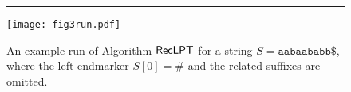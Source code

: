 \begin{figure}[t]
  \centering
  \rule{0.09\textwidth}{0em}
\texttt{[image: fig3run.pdf]}
\vspace{.75\baselineskip}
\caption{An example run of Algorithm $\textsf{RecLPT}$ for a string $S = \mathtt{aabaababb\$}$, where the left endmarker $S[0]=\#$ and the related suffixes are omitted. 
}\label{fig:run:example}
\end{figure}











